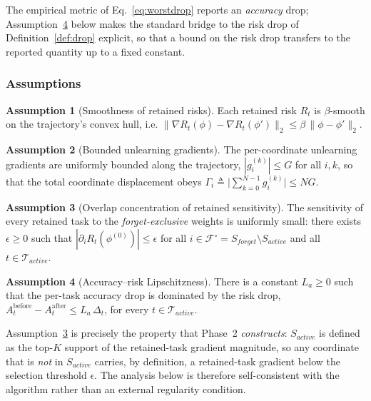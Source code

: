 \documentclass[conference]{IEEEtran}
\theoremstyle{plain}
\theoremstyle{definition}
\newtheorem{assumption}{Assumption}
\theoremstyle{remark}
\begin{document}
\noindent
The empirical metric of Eq.~\eqref{eq:worstdrop} reports an
\emph{accuracy} drop; Assumption~\ref{ass:lipschitz-acc} below makes
the standard bridge to the risk drop of Definition~\ref{def:drop}
explicit, so that a bound on the risk drop transfers to the reported
quantity up to a fixed constant.

\subsubsection*{Assumptions}

\begin{assumption}[Smoothness of retained risks]
\label{ass:smooth}
Each retained risk $R_{t}$ is $\beta$-smooth on the trajectory's
convex hull, i.e.
$\big\|\nabla R_{t}(\phi)-\nabla R_{t}(\phi')\big\|_{2}\le\beta\,\|\phi-\phi'\|_{2}$.
\end{assumption}

\begin{assumption}[Bounded unlearning gradients]
\label{ass:bounded}
The per-coordinate unlearning gradients are uniformly bounded along
the trajectory, $|g^{(k)}_{i}|\le G$ for all $i,k$, so that the total
coordinate displacement obeys
$\Gamma_{i}\triangleq\big|\sum_{k=0}^{N-1} g^{(k)}_{i}\big|\le NG$.
\end{assumption}

\begin{assumption}[Overlap concentration of retained sensitivity]
\label{ass:concentration}
The sensitivity of every retained task to the \emph{forget-exclusive}
weights is uniformly small: there exists $\epsilon\ge 0$ such that
$|\partial_{i} R_{t}(\phi^{(0)})|\le\epsilon$ for all
$i\in\mathcal{F}^{\!\circ}=S_{forget}\setminus S_{active}$ and all
$t\in\mathcal{T}_{active}$.
\end{assumption}

\begin{assumption}[Accuracy--risk Lipschitzness]
\label{ass:lipschitz-acc}
There is a constant $L_{a}\ge 0$ such that the per-task accuracy drop
is dominated by the risk drop,
$A_{t}^{\text{before}}-A_{t}^{\text{after}}\le L_{a}\,\Delta_{t}$,
for every $t\in\mathcal{T}_{active}$.
\end{assumption}

\noindent
Assumption~\ref{ass:concentration} is precisely the property that
Phase~2 \emph{constructs}: $S_{active}$ is defined as the top-$K$
support of the retained-task gradient magnitude, so any coordinate
that is \emph{not} in $S_{active}$ carries, by definition, a
retained-task gradient below the selection threshold $\epsilon$. The
analysis below is therefore self-consistent with the algorithm rather
than an external regularity condition.
\end{document}
